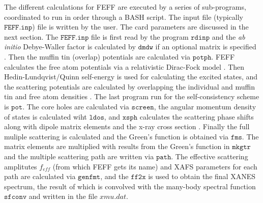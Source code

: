 The different calculations for FEFF are executed by a series of sub-programs, coordinated to run in order through a BASH script. The input file (typically $\texttt{FEFF.inp}$) file is written by the user. The card parameters are discussed in the next section. The $\texttt{FEFF.inp}$ file is first read by the program $\texttt{rdinp}$ and the \textit{ab initio} Debye-Waller factor is calculated by $ \texttt{dmdw} $ if an optional matrix is specified \cite{feff-dw}. Then the muffin tin (overlap) potentials are calculated via $\texttt{potph}$. FEFF calculates the free atom potentials via a relativistic Dirac-Fock model \cite{feff-dirac-fock}. Then Hedin-Lundqvist/Quinn self-energy is used for calculating the excited states, and the scattering potentials are calculated by overlapping the individual and muffin tin and free atom densities \cite{rehr2009ab}. The last program run for the self-consistency scheme is $ \texttt{pot} $. The core holes are calculated via $ \texttt{screen} $, the angular momentum density of states is calculated wiht $ \texttt{ldos} $, and $ \texttt{xsph} $ calculates the scattering phase shifts along with dipole matrix elements and the x-ray cross section \cite{feff-mean-free-path}. Finally the full muliple scattering \cite{feff-multiple-scattering} is calculated and the Green's function is obtained via $ \texttt{fms} $. The matrix elements are multiplied with results from the Green's function in $ \texttt{mkgtr} $ and the multiple scattering path are written via $ \texttt{path} $. The effective scattering amplitutes $ f_{eff} $ (from which FEFF gets its name) and XAFS parameters for each path are calculated via $ \texttt{genfmt} $, and the $ \texttt{ff2x} $ is used to obtain the final XANES spectrum, the result of which is convolved with the many-body spectral function $ \texttt{sfconv} $ and written in the file $ xmu.dat $.     

